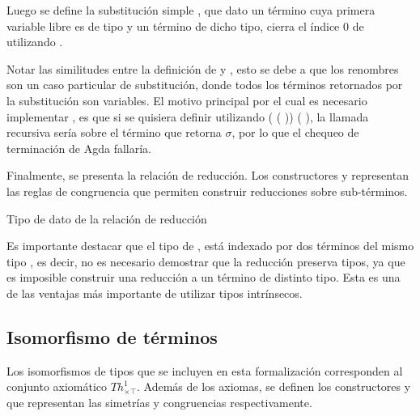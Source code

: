 \documentclass[]{report}
\begin{document}
	Luego se define la substitución simple \AgdaFunction{$\_[\_]$}, que dato un término  cuya primera variable libre es de tipo  y un término  de dicho tipo, cierra el índice 0 de  utilizando .
	
	
	Notar las similitudes entre la definición de  y , esto se debe a que los renombres son un caso particular de substitución, donde todos los términos retornados por la substitución son variables.
	El motivo principal por el cual es necesario implementar , es que si se quisiera definir  utilizando  (\AgdaSymbol{$\lambda$}  \AgdaSymbol{$\rightarrow$}  ( )) (\AgdaBound{$\sigma$} ), la llamada recursiva sería sobre el término que retorna $\sigma$, por lo que el chequeo de terminación de Agda fallaría.
	
	
	Finalmente, se presenta la relación de reducción.
	Los constructores \AgdaInductiveConstructor{$\xi$} y \AgdaInductiveConstructor{$\zeta$} representan las reglas de congruencia que permiten construir reducciones sobre sub-términos.

	\begin{codigo}
		Tipo de dato de la relación de reducción
		
	\end{codigo}
	
	Es importante destacar que el tipo de \AgdaDatatype{$\_\hookrightarrow\_$}, está indexado por dos términos del mismo tipo , es decir, no es necesario demostrar que la reducción preserva tipos, ya que es imposible construir una reducción a un término de distinto tipo.
	Esta es una de las ventajas más importante de utilizar tipos intrínsecos.
	
	
	\subsection{Isomorfismo de términos}
	
	Los isomorfismos de tipos que se incluyen en esta formalización corresponden al conjunto axiomático $Th^1_{\times\top}$.
	Además de los axiomas, se definen los constructores  y  que representan las simetrías y congruencias respectivamente.
	
\end{document}
